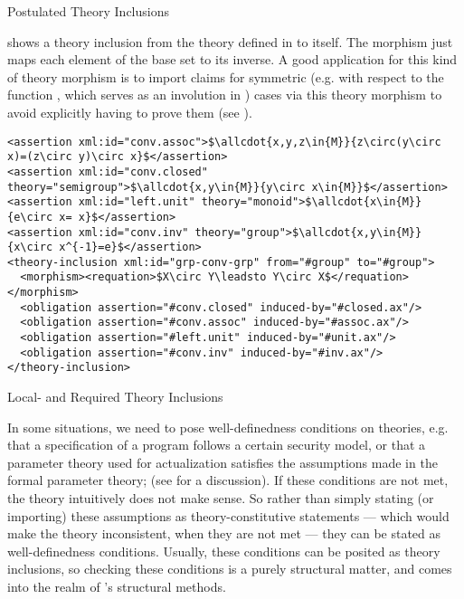 \begin{omgroup}[id=complex-theories,short=Complex Theories,
                            creators=miko,contributors=frabe]
\begin{omgroup}[id=theory-inclusions]{Postulated Theory Inclusions}
\begin{module}[id=theory-morphisms]
{} shows a theory inclusion from the theory {}
defined in {} to itself. The morphism just maps each element of the
base set to its inverse. A good application for this kind of theory morphism is to import
claims for symmetric (e.g. with respect to the function {}, which serves as
an involution in {}) cases via this theory morphism to avoid explicitly
having to prove them (see ).

\begin{lstlisting}[label=lst:theory-inclusion,mathescape,
  caption={A Theory Inclusion for Groups},
  index={theory-inclusion,morphism,requation,assertion}]
<assertion xml:id="conv.assoc">$\allcdot{x,y,z\in{M}}{z\circ(y\circ x)=(z\circ y)\circ x}$</assertion>
<assertion xml:id="conv.closed" theory="semigroup">$\allcdot{x,y\in{M}}{y\circ x\in{M}}$</assertion>
<assertion xml:id="left.unit" theory="monoid">$\allcdot{x\in{M}}{e\circ x= x}$</assertion>
<assertion xml:id="conv.inv" theory="group">$\allcdot{x,y\in{M}}{x\circ x^{-1}=e}$</assertion>
<theory-inclusion xml:id="grp-conv-grp" from="#group" to="#group">
  <morphism><requation>$X\circ Y\leadsto Y\circ X$</requation></morphism>
  <obligation assertion="#conv.closed" induced-by="#closed.ax"/>
  <obligation assertion="#conv.assoc" induced-by="#assoc.ax"/>
  <obligation assertion="#left.unit" induced-by="#unit.ax"/>
  <obligation assertion="#conv.inv" induced-by="#inv.ax"/>
</theory-inclusion>  
\end{lstlisting}
\end{module}
\end{omgroup}

\begin{omgroup}[id=restricting-inference,short=Local/Required Theory Inclusions]{Local- and
  Required Theory Inclusions}
\begin{module}[id=restinf]

In some situations, we need to pose well-definedness conditions on theories, e.g. that a
specification of a program follows a certain security model, or that a parameter theory
used for actualization satisfies the assumptions made in the formal parameter theory; (see
{} for a discussion). If these conditions are not met, the theory
intuitively does not make sense. So rather than simply stating (or importing) these
assumptions as theory-constitutive statements --- which would make the theory
inconsistent, when they are not met --- they can be stated as well-definedness
conditions. Usually, these conditions can be posited as theory inclusions, so checking
these conditions is a purely structural matter, and comes into the realm of \omdoc's
structural methods.


\end{module}
\end{omgroup}
\end{omgroup}
